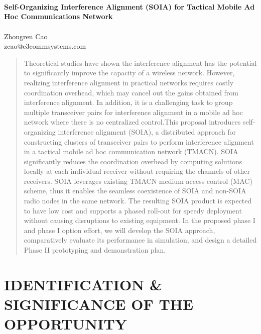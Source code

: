 \documentclass[letterpaper,11pt]{article}
\begin{document}


\begin{center}
~\\
~\\
~\\
{\Large{\huge\bf{Self-Organizing Interference Alignment (SOIA) for Tactical Mobile Ad Hoc Communications Network}}}\\
~\\
\vspace{0.1in}
Zhongren Cao\\
zcao@c3commsystems.com
\end{center}

\vspace{0.1in}

\begin{abstract}
Theoretical studies have shown the interference alignment has the potential to significantly improve the capacity of a wireless network. However, realizing interference alignment in practical networks requires costly coordination overhead, which may cancel out the gains obtained from interference alignment. In addition, it is a challenging task to group multiple transceiver pairs for interference alignment in a mobile ad hoc network where there is no centralized control.This proposal introduces self-organizing interference alignment (SOIA), a distributed approach for constructing clusters of transceiver pairs to perform interference alignment in a tactical mobile ad hoc communication network (TMACN). SOIA significantly reduces the coordination overhead by computing solutions locally at each individual receiver without requiring the channels of other receivers. SOIA leverages existing TMACN medium access control (MAC) scheme, thus it enables the seamless coexistence of  SOIA and non-SOIA radio nodes in the same network. The resulting SOIA product is expected to have low cost and supports a phased roll-out for speedy deployment without causing disruptions to existing equipment. In the proposed phase I and phase I option effort, we will develop the SOIA approach, comparatively evaluate its performance in simulation, and design a detailed Phase II prototyping and demonstration plan.
\end{abstract}

\newpage

\section{IDENTIFICATION \& SIGNIFICANCE OF THE OPPORTUNITY}
\end{document}
